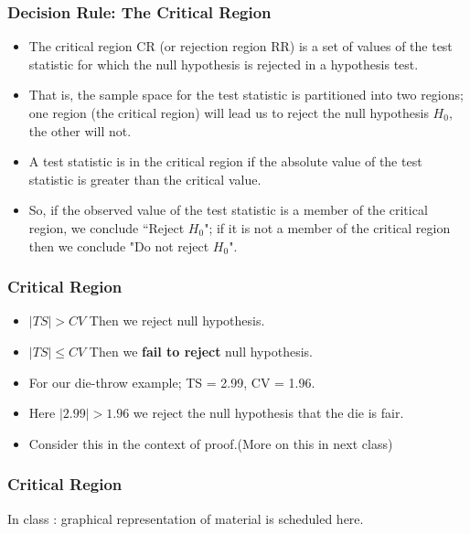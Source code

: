 \documentclass[]{report}
\begin{document}


\subsubsection{Decision Rule:  The Critical Region}
\begin{itemize}
\item The critical region CR (or rejection region RR) is a set of values of the test statistic for which the null hypothesis is rejected in a hypothesis test. \item That is, the sample space for the test statistic is partitioned into two regions; one region (the critical region) will lead us to reject the null hypothesis $H_0$, the other will not.

\item A test statistic is in the critical region if the absolute value of the test statistic is greater than the critical value.
\item So, if the observed value of the test statistic is a member of the critical region, we conclude ``Reject $H_0$"; if it is not a member of the critical region then we conclude "Do not reject $H_0$".
\end{itemize}




\subsubsection{Critical Region}
\begin{itemize}

\item $|TS| > CV$ Then we reject null hypothesis.
\item $|TS| \leq CV$ Then we \textbf{fail to reject} null hypothesis.

\item For our die-throw example; TS = 2.99, CV = 1.96.
\item Here $|2.99| > 1.96$ we reject the null hypothesis that the die is fair.
\item Consider this in the context of proof.(More on this in next class)
\end{itemize}



\subsubsection{Critical Region}
In class : graphical representation of material is scheduled here.
\end{document}
